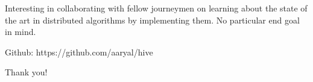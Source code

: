 \documentclass{beamer}
\begin{document}
\begin{frame}
  Interesting in collaborating with fellow journeymen on learning
  about the state of the art in distributed algorithms by implementing
  them. No particular end goal in mind.

  Github: https://github.com/aaryal/hive
  
  Thank you!
\end{frame}
\end{document}
